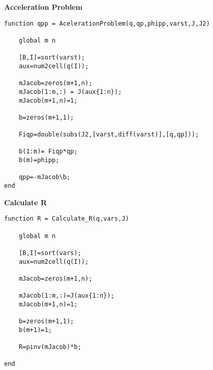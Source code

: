 \textbf{Acceleration Problem}
\begin{lstlisting}[style=codematlab]
function qpp = AcelerationProblem(q,qp,phipp,varst,J,J2)
    
    global m n

    [B,I]=sort(varst);
    aux=num2cell(q(I));
    
    mJacob=zeros(m+1,n);
    mJacob(1:m,:) = J(aux{1:n});
    mJacob(m+1,n)=1; 
    
    b=zeros(m+1,1);

    Fiqp=double(subs(J2,[varst,diff(varst)],[q,qp]));
    
    b(1:m)= Fiqp*qp;
    b(m)=phipp;  
    
    qpp=-mJacob\b; 
end
\end{lstlisting}

\textbf{Calculate R}
\begin{lstlisting}[style=codematlab]
function R = Calculate_R(q,vars,J)

    global m n

    [B,I]=sort(vars);
    aux=num2cell(q(I));
    
    mJacob=zeros(m+1,n);

    mJacob(1:m,:)=J(aux{1:n});
    mJacob(m+1,n)=1;
    
    b=zeros(m+1,1);
    b(m+1)=1;
    
    R=pinv(mJacob)*b; 
    
end
\end{lstlisting}

